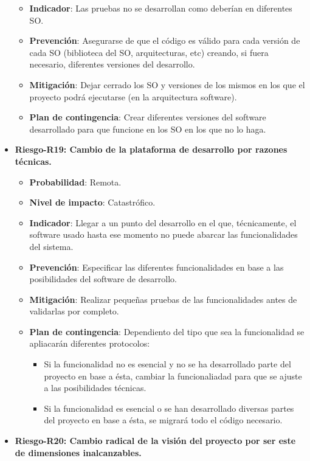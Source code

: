 \begin{itemize}
\begin{itemize}
		\item{ \bf Indicador}: Las pruebas no se desarrollan como deberían en diferentes SO.
		\item{ \bf Prevención}: Asegurarse de que el código es válido para cada versión de cada SO (biblioteca del SO, arquitecturas, etc) creando, si fuera necesario, diferentes versiones del desarrollo.
		\item{ \bf Mitigación}: Dejar cerrado los SO y versiones de los mismos en los que el proyecto podrá ejecutarse (en la arquitectura software).
		\item{ \bf Plan de contingencia}: Crear diferentes versiones del software desarrollado para que funcione en los SO en los que no lo haga.\\
		\end{itemize}
\item { \bf Riesgo-R19: Cambio de la plataforma de desarrollo por razones técnicas.}
		\begin{itemize}	
		\item{ \bf Probabilidad}: Remota.
		\item{ \bf Nivel de impacto}: Catastrófico.
		\item{ \bf Indicador}: Llegar a un punto del desarrollo en el que, técnicamente, el software usado hasta ese momento no puede abarcar las funcionalidades del sistema.
		\item{ \bf Prevención}: Especificar las diferentes funcionalidades en base a las posibilidades del software de desarrollo.
		\item{ \bf Mitigación}: Realizar pequeñas pruebas de las funcionalidades antes de validarlas por completo.
		\item{ \bf Plan de contingencia}: Dependiento del tipo que sea la funcionalidad se apliacarán diferentes protocolos:
			\begin{itemize}
			\item Si la funcionalidad no es esencial y no se ha desarrollado parte del proyecto en base a ésta, cambiar la funcionaliadad para que se ajuste a las posibilidades técnicas.
			\item Si la funcionalidad es esencial o se han desarrollado diversas partes del proyecto en base a ésta, se migrará todo el código necesario.\\
			\end{itemize}
		\end{itemize}
\item { \bf Riesgo-R20: Cambio radical de la visión del proyecto por ser este de dimensiones inalcanzables.}

\end{itemize}

